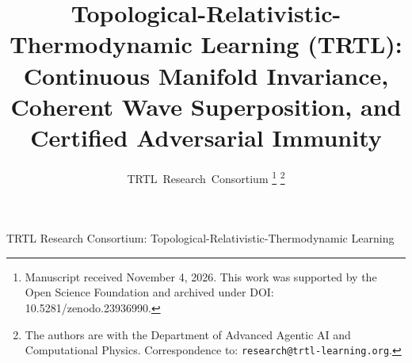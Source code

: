 \documentclass[journal,twoside]{IEEEtran}
\theoremstyle{remark}
\begin{document}
\title{Topological-Relativistic-Thermodynamic Learning (TRTL): Continuous Manifold Invariance, Coherent Wave Superposition, and Certified Adversarial Immunity}

\author{TRTL~Research~Consortium%
\thanks{Manuscript received November 4, 2026. This work was supported by the Open Science Foundation and archived under DOI: 10.5281/zenodo.23936990.}%
\thanks{The authors are with the Department of Advanced Agentic AI and Computational Physics. Correspondence to: \texttt{research@trtl-learning.org}.}}

%
{TRTL Research Consortium: Topological-Relativistic-Thermodynamic Learning}

\maketitle
\end{document}

